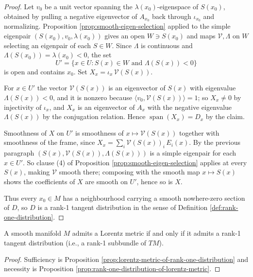 \begin{proof}
Let $v_0$ be a unit vector spanning the $\lambda(x_0)$-eigenspace of $S(x_0)$, obtained by pulling a negative eigenvector of $A_{x_0}$ back through $\iota_{x_0}$ and normalizing. Proposition \ref{prop:smooth-eigen-selection} applied to the simple eigenpair $(S(x_0), v_0, \lambda(x_0))$ gives an open $W \ni S(x_0)$ and maps $\mathcal{V}, \Lambda$ on $W$ selecting an eigenpair of each $S \in W$. Since $\Lambda$ is continuous and $\Lambda(S(x_0)) = \lambda(x_0) < 0$, the set
\[
  U' = \{x \in U : S(x) \in W \text{ and } \Lambda(S(x)) < 0\}
\]
is open and contains $x_0$. Set $X_x = \iota_x\,\mathcal{V}(S(x))$.

For $x \in U'$ the vector $\mathcal{V}(S(x))$ is an eigenvector of $S(x)$ with eigenvalue $\Lambda(S(x)) < 0$, and it is nonzero because $\langle v_0, \mathcal{V}(S(x))\rangle = 1$; so $X_x \neq 0$ by injectivity of $\iota_x$, and $X_x$ is an eigenvector of $A_x$ with the negative eigenvalue $\Lambda(S(x))$ by the conjugation relation. Hence $\operatorname{span}(X_x) = D_x$ by the claim.

Smoothness of $X$ on $U'$ is smoothness of $x \mapsto \mathcal{V}(S(x))$ together with smoothness of the frame, since $X_x = \sum_i \mathcal{V}(S(x))_i\,E_i(x)$. By the previous paragraph $(S(x), \mathcal{V}(S(x)), \Lambda(S(x)))$ is a simple eigenpair for each $x \in U'$. So clause (4) of Proposition \ref{prop:smooth-eigen-selection} applies at every $S(x)$, making $\mathcal{V}$ smooth there; composing with the smooth map $x \mapsto S(x)$ shows the coefficients of $X$ are smooth on $U'$, hence so is $X$.

Thus every $x_0 \in M$ has a neighbourhood carrying a smooth nowhere-zero section of $D$, so $D$ is a rank-1 tangent distribution in the sense of Definition \ref{def:rank-one-distribution}.
\end{proof}

\begin{theorem}
\label{thm:lorentz-metrics}
\leanok
{}
A smooth manifold $M$ admits a Lorentz metric if and only if it admits a rank-1 tangent distribution (i.e., a rank-1 subbundle of $TM$).
\end{theorem}

\begin{proof}
\leanok
{}
Sufficiency is Proposition \ref{prop:lorentz-metric-of-rank-one-distribution} and necessity is Proposition \ref{prop:rank-one-distribution-of-lorentz-metric}.
\end{proof}

